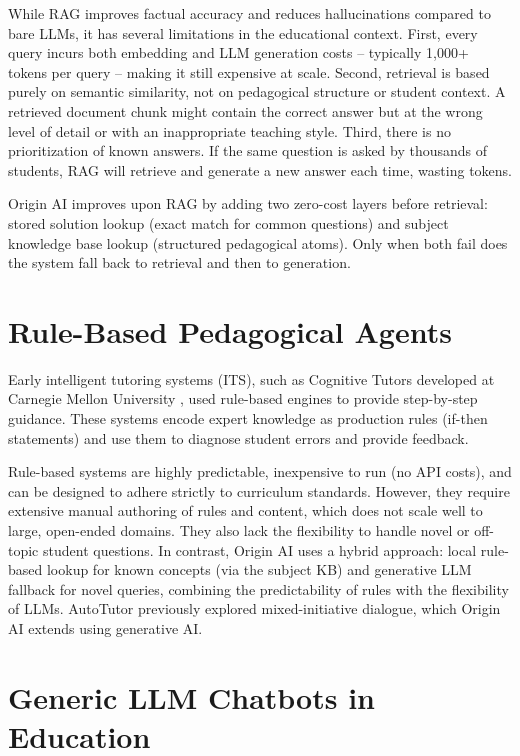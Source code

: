 While RAG improves factual accuracy and reduces hallucinations compared to bare LLMs, it has several limitations in the educational context. First, every query incurs both embedding and LLM generation costs – typically 1,000+ tokens per query – making it still expensive at scale. Second, retrieval is based purely on semantic similarity, not on pedagogical structure or student context. A retrieved document chunk might contain the correct answer but at the wrong level of detail or with an inappropriate teaching style. Third, there is no prioritization of known answers. If the same question is asked by thousands of students, RAG will retrieve and generate a new answer each time, wasting tokens.

Origin AI improves upon RAG by adding two zero-cost layers before retrieval: stored solution lookup (exact match for common questions) and subject knowledge base lookup (structured pedagogical atoms). Only when both fail does the system fall back to retrieval and then to generation.

\section{Rule-Based Pedagogical Agents}

Early intelligent tutoring systems (ITS), such as Cognitive Tutors developed at Carnegie Mellon University \cite{anderson1995cognitive}, used rule-based engines to provide step-by-step guidance. These systems encode expert knowledge as production rules (if-then statements) and use them to diagnose student errors and provide feedback.

Rule-based systems are highly predictable, inexpensive to run (no API costs), and can be designed to adhere strictly to curriculum standards. However, they require extensive manual authoring of rules and content, which does not scale well to large, open-ended domains. They also lack the flexibility to handle novel or off-topic student questions. In contrast, Origin AI uses a hybrid approach: local rule-based lookup for known concepts (via the subject KB) and generative LLM fallback for novel queries, combining the predictability of rules with the flexibility of LLMs. AutoTutor \cite{graesser2005autotutor} previously explored mixed-initiative dialogue, which Origin AI extends using generative AI.

\section{Generic LLM Chatbots in Education}

